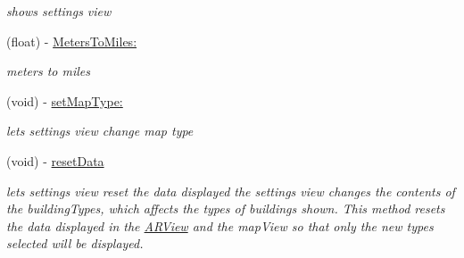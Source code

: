 \begin{DoxyCompactItemize}
\begin{DoxyCompactList}\small\item\em shows settings view \end{DoxyCompactList}\item 
(float) -\/ \hyperlink{interface_virt_tour_view_controller_ac005fa3df83e49cdab193568d352834d}{Meters\-To\-Miles\-:}
\begin{DoxyCompactList}\small\item\em meters to miles \end{DoxyCompactList}\item 
(void) -\/ \hyperlink{interface_virt_tour_view_controller_ad077ea4c02d3acf879ee0d42442813c4}{set\-Map\-Type\-:}
\begin{DoxyCompactList}\small\item\em lets settings view change map type \end{DoxyCompactList}\item 
(void) -\/ \hyperlink{interface_virt_tour_view_controller_ab51301d11ddc80165b3b7798b866421e}{reset\-Data}
\begin{DoxyCompactList}\small\item\em lets settings view reset the data displayed  the settings view changes the contents of the building\-Types, which affects the types of buildings shown. This method resets the data displayed in the \hyperlink{interface_a_r_view}{A\-R\-View} and the map\-View so that only the new types selected will be displayed. \end{DoxyCompactList}\end{DoxyCompactItemize}
